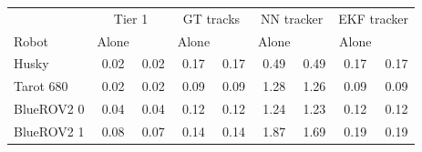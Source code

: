 \begin{tabular}{lcccccccc}
\toprule
 & \multicolumn{2}{c}{Tier 1} & \multicolumn{2}{c}{GT tracks} & \multicolumn{2}{c}{NN tracker} & \multicolumn{2}{c}{EKF tracker} \\
Robot & Alone & \avatar{} & Alone & \avatar{} & Alone & \avatar{} & Alone & \avatar{} \\
\midrule
Husky & 0.02 & 0.02 & 0.17 & 0.17 & 0.49 & 0.49 & 0.17 & 0.17 \\
Tarot 680 & 0.02 & 0.02 & 0.09 & 0.09 & 1.28 & 1.26 & 0.09 & 0.09 \\
BlueROV2 0 & 0.04 & 0.04 & 0.12 & 0.12 & 1.24 & 1.23 & 0.12 & 0.12 \\
BlueROV2 1 & 0.08 & 0.07 & 0.14 & 0.14 & 1.87 & 1.69 & 0.19 & 0.19 \\
\bottomrule
\end{tabular}
